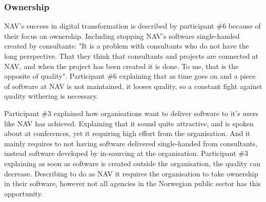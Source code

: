 \subsubsection{Ownership}
NAV's success in digital transformation is described by participant \#6 because of their focus on ownership. Including stopping NAV's software single-handed created by consultants: "It is a problem with consultants who do not have the long perspective. That they think that consultants and projects are connected at NAV, and when the project has been created it is done. To me, that is the opposite of quality". Participant \#6 explaining that as time goes on and a piece of software at NAV is not maintained, it looses quality, so a constant fight against quality withering is necessary.


Participant \#3 explained how organisations want to deliver software to it's users like NAV has achieved. Explaining that it sound quite attractive, and is spoken about at conferences, yet it requiring high effort from the organisation. And it mainly requires to not having software delivered single-handed from consultants, instead software developed by in-sourcing at the organisation. Participant \#3 explaining as soon as software is created outside the organisation, the quality can decrease. Describing to do as NAV it requires the organisation to take ownership in their software, however not all agencies in the Norwegian public sector has this opportunity.


